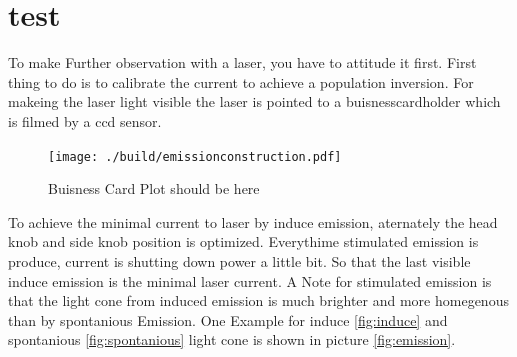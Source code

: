 \section{test}%
\label{sec:test}
To make Further observation with a laser, you have to attitude it first. 
First thing to do is to calibrate the current to achieve a population inversion. 
For makeing the laser light visible the laser is pointed to a buisnesscardholder
which is filmed by a ccd sensor.
\begin{figure}[h]
		\centering
		\texttt{[image: ./build/emissionconstruction.pdf]}
		\caption{Buisness Card Plot should be here}
		\label{fig:aufbau}
\end{figure}
To achieve the minimal current to laser by induce emission, aternately the head
knob and side knob position is optimized.
Everythime stimulated emission is produce, current is shutting down power a
little bit. 
So that the last visible induce emission is the minimal laser current. 
A Note for stimulated emission is that the light cone from induced emission is
much brighter and more homegenous than by spontanious Emission.
One Example for induce \ref{fig:induce} and spontanious \ref{fig:spontanious} light cone is shown in picture \ref{fig:emission}.
